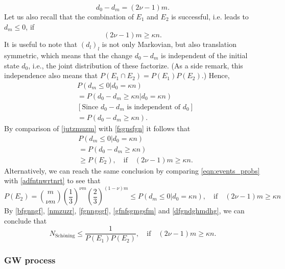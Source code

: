 \documentclass[a4paper,aps,floatfix]{revtex4}
\begin{document}
\begin{equation}
\label{fsgnsfgn}
d_0-d_m = (2\nu-1)m.
\end{equation}
Let us also recall that the combination of  $E_1$ and $E_2$ is successful, i.e. leads to $d_m\leq 0$, if 
\begin{equation}
(2\nu -1)m\geq \kappa n.
\end{equation}
It is useful to note that $(d_l)_l$ is not only Markovian, but also translation symmetric, which means that the change $d_0-d_m$ is independent of the initial state $d_0$, i.e., the joint distribution of these factorize. (As a side remark, this independence also means that $P(E_1\cap E_2) = P(E_1)P(E_2)$.)
 Hence,
\begin{equation}
\label{jutzmuzm}
\begin{split}
& P(d_{m}\leq 0|d_0 = \kappa n)\\
& = P(d_0-d_{m}\geq \kappa n|d_0 = \kappa n)\\
& [\textrm{Since $d_0-d_m$ is independent of $d_0$}]\\
& = P(d_0-d_{m}\geq \kappa n).
\end{split}
\end{equation}
By comparison of \eqref{jutzmuzm} with \eqref{fsgnsfgn} it follows that 
\begin{equation}
\label{dfgndghmdhg}
\begin{split}
& P(d_{m}\leq 0|d_0 = \kappa n)\\
& = P(d_0-d_{m}\geq \kappa n)\\
&\geq P(E_2),\quad \mathrm{if}\quad (2\nu -1)m\geq \kappa n. 
\end{split}
\end{equation}
Alternatively, we can reach the same conclusion by comparing \eqref{eqn:events_probs} with  \eqref{adfntnwrtnrt} to see  that  
\begin{equation}
\label{sfgnsfmfm}
P(E_2) =  \binom{m}{\nu m}\left(\frac{1}{3}\right)^{\nu m}\left(\frac{2}{3}\right)^{(1-\nu)m}
\leq P(d_m\leq 0|d_0 = \kappa n),\quad  \mathrm{if}\quad (2\nu -1)m\geq \kappa n
\end{equation}
By \eqref{bfgnngf}, \eqref{nmzuzr}, \eqref{fgnngsgf}, \eqref{gfnfsgmgsfm} and \eqref{dfgndghmdhg}, we can conclude that
\begin{equation}
N_{\textrm{Sch\"oning}}\leq \frac{1}{P(E_1)P(E_2)},\quad \mathrm{if}\quad (2\nu -1)m\geq \kappa n.
\end{equation}

\subsubsection{GW process}
\end{document}
